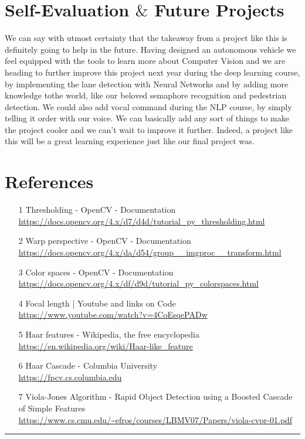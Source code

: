 \documentclass[12pt,a4paper]{article}
\begin{document}
\begin{large}
\section{Self-Evaluation $\&$ Future Projects}
We can say with utmost certainty that the takeaway from a project like this is definitely going to help in the future. Having designed an autonomous vehicle we feel equipped with the tools to learn more about Computer Vision and we are heading to further improve this project next year during the deep learning course, by implementing the lane detection with Neural Networks and by adding more knowledge tothe world, like our beloved semaphore recognition and pedestrian detection. We could also add vocal command during the NLP course, by simply telling it order with our voice. We can basically add any sort of things to make the project cooler and we can't wait to improve it further. Indeed, a project like this will be a great learning experience just like our final project was. \\

\section{References}
\begin{itemize}
\item[1] Thresholding - OpenCV - Documentation\\ \url{https://docs.opencv.org/4.x/d7/d4d/tutorial_py_thresholding.html}
\item[2] Warp perspective - OpenCV - Documentation\\
\url{https://docs.opencv.org/4.x/da/d54/group__imgproc__transform.html}
\item[3] Color spaces - OpenCV - Documentation\\
\url{https://docs.opencv.org/4.x/df/d9d/tutorial_py_colorspaces.html}
\item[4]  Focal length | Youtube and links on Code \\
\url{https://www.youtube.com/watch?v=4CoEsqePADw}
\item[5] Haar features - Wikipedia, the free encyclopedia\\
\url{https://en.wikipedia.org/wiki/Haar-like_feature}
\item[6] Haar Cascade - Columbia University\\
\url{https://fpcv.cs.columbia.edu}
\item[7] Viola-Jones Algorithm - Rapid Object Detection using a Boosted Cascade of Simple Features\\
\url{https://www.cs.cmu.edu/~efros/courses/LBMV07/Papers/viola-cvpr-01.pdf}
\end{itemize}

\noindent\rule{18.5cm}{0.4pt}
\end{large} 
\end{document}
